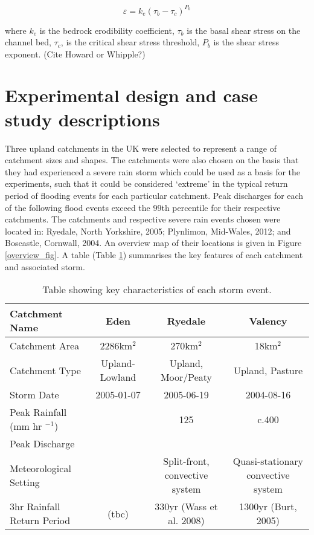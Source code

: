 \documentclass[12pt,oneside,PhD]{muthesis}
\begin{document}
\begin{equation}
\varepsilon = k_e(\tau_b - \tau_c)^{P_b}
\end{equation}

where \(k_e\) is the bedrock erodibility coefficient, \(\tau_b\) is the basal shear stress on the channel bed, \(\tau_c\), is the critical shear stress threshold, \(P_b\) is the shear stress exponent. (Cite Howard or Whipple?)

\section{Experimental design and case study descriptions}
Three upland catchments in the UK were selected to represent a range of catchment sizes and shapes. The catchments were also chosen on the basis that they had experienced a severe rain storm which could be used as a basis for the experiments, such that it could be considered `extreme' in the typical return period of flooding events for each particular catchment. Peak discharges for each of the following flood events exceed the 99th percentile for their respective catchments. The catchments and respective severe rain events chosen were located in: Ryedale, North Yorkshire, 2005; Plynlimon, Mid-Wales, 2012; and Boscastle, Cornwall, 2004. An overview map of their locations is given in Figure \ref{overview_fig}. A table (Table \ref{met_setting}) summarises the key features of each catchment and associated storm.

\linespread{1.3}
\begin{table}
\resizebox{\textwidth}{!}
{%
\begin{tabular}{l c c c} \hline

Catchment Name& \textbf{Eden} 			& \textbf{Ryedale} &  \textbf{Valency} \\ \hline
Catchment Area & 2286km$^2$ 			& 270km$^2$ 				& 18km$^2$ \\ 
Catchment Type & Upland-Lowland & Upland, Moor/Peaty & Upland, Pasture \\ 
Storm Date	 		&  2005-01-07	 & 2005-06-19 	& 2004-08-16 \\ 
Peak Rainfall	 (mm hr \(^{-1}\)) & & 125  & c.400 \\
Peak Discharge	 	& & & \\ 
Meteorological Setting	& 	& Split-front, convective system & Quasi-stationary convective system \\ 
3hr Rainfall Return Period 		& (tbc)	 & 330yr (Wass et al. 2008)	& 1300yr (Burt, 2005) \\ \hline
\end{tabular}
}
\caption{Table showing key characteristics of each storm event.}
\label{met_setting}
\end{table}
\end{document}
